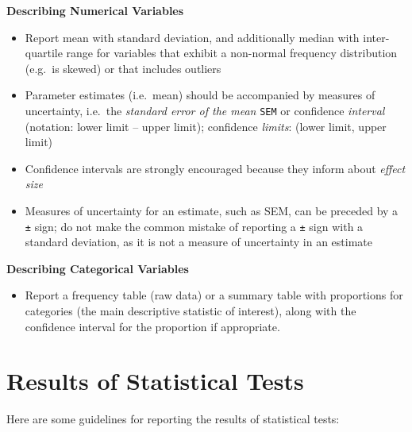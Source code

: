 \documentclass[
]{book}
\providecommand{\tightlist}{%
  \setlength{\itemsep}{0pt}\setlength{\parskip}{0pt}}
\begin{document}
\textbf{Describing Numerical Variables}

\begin{itemize}
\tightlist
\item
  Report mean with standard deviation, and additionally median with inter-quartile range for variables that exhibit a non-normal frequency distribution (e.g.~is skewed) or that includes outliers
\item
  Parameter estimates (i.e.~mean) should be accompanied by measures of uncertainty, i.e.~the \emph{standard error of the mean} \texttt{SEM} or confidence \emph{interval} (notation: lower limit -- upper limit); confidence \emph{limits}: (lower limit, upper limit)
\item
  Confidence intervals are strongly encouraged because they inform about \emph{effect size}
\item
  Measures of uncertainty for an estimate, such as SEM, can be preceded by a \texttt{±} sign; do not make the common mistake of reporting a \texttt{±} sign with a standard deviation, as it is not a measure of uncertainty in an estimate
\end{itemize}

\textbf{Describing Categorical Variables}

\begin{itemize}
\tightlist
\item
  Report a frequency table (raw data) or a summary table with proportions for categories (the main descriptive statistic of interest), along with the confidence interval for the proportion if appropriate.
\end{itemize}

\hypertarget{results-of-statistical-tests}{%
\section{Results of Statistical Tests}\label{results-of-statistical-tests}}

Here are some guidelines for reporting the results of statistical tests:
\end{document}
